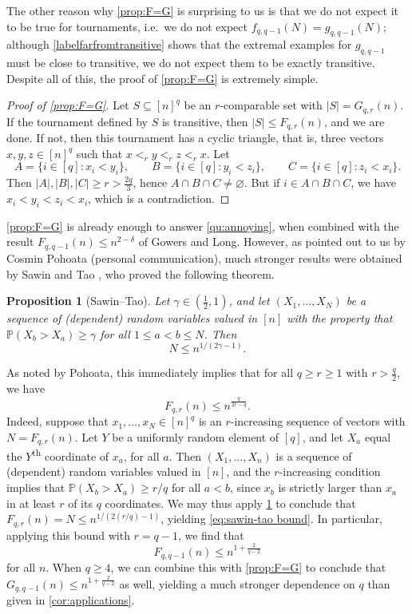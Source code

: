 \documentclass[11pt,reqno]{amsart}
\newtheorem{proposition}[theorem]{Proposition}
\theoremstyle{definition}
\newcommand\ab[1]{\lvert#1\rvert}
\newcommand\1{\mathbf{1}}
\let\leq\leqslant
\let\geq\geqslant
\begin{document}
The other reason why \cref{prop:F=G} is surprising to us is that we do not expect it to be true for tournaments, i.e.\ we do not expect $f_{q,q-1}(N)=g_{q,q-1}(N)$; although \cref{labelfarfromtransitive} shows that the extremal examples for $g_{q,q-1}$ must be close to transitive, we do not expect them to be exactly transitive.
Despite all of this, the proof of \cref{prop:F=G} is extremely simple.
\begin{proof}[Proof of \cref{prop:F=G}]
    Let $S \subseteq [n]^q$ be an $r$-comparable set with $\ab S = G_{q,r}(n)$. If the tournament defined by $S$ is transitive, then $\ab S \leq F_{q,r}(n)$, and we are done. If not, then this tournament has a cyclic triangle, that is, three vectors $x,y,z \in [n]^q$ such that $x <_r y <_r z <_r x$. Let
    \[
        A = \{i \in [q]: x_i < y_i \} ,\qquad B = \{i \in [q]: y_i < z_i \} ,\qquad C = \{i \in [q]: z_i < x_i \} .
    \]
    Then $\ab A, \ab B, \ab C \geq r > \frac{2q}{3}$, hence $A \cap B \cap C \neq \varnothing$. But if $i \in A \cap B \cap C$, we have $x_i < y_i < z_i < x_i$, which is a contradiction.
\end{proof}
\cref{prop:F=G} is already enough to answer \cref{qu:annoying}, when combined with the result $F_{q,q-1}(n) \leq n^{2-\delta}$ of Gowers and Long. However, as pointed out to us by Cosmin Pohoata (personal communication), much stronger results were obtained by Sawin and Tao \cite{206224}, who proved the following theorem.
\begin{proposition}[Sawin--Tao]\label{prop:sawin-tao}
    Let $\gamma \in (\frac 12, 1)$, and let $(X_1,\dots,X_N)$ be a sequence of (dependent) random variables valued in $[n]$ with the property that $\mathbb P(X_b>X_a) \geq \gamma$ for all $1 \leq a<b\leq N$. Then
    \[
    N \leq n^{1/(2\gamma-1)}.
    \]
\end{proposition}
As noted by Pohoata, this immediately implies that 
for all $q \geq r \geq 1$ with $r>\frac q2$, we have
\begin{equation}\label{eq:sawin-tao bound}
    F_{q,r}(n) \leq n^{\frac{q}{2r-q}}.
\end{equation}
Indeed, suppose that $x_1,\dots,x_N \in [n]^q$ is an $r$-increasing sequence of vectors with $N=F_{q,r}(n)$. Let $Y$ be a uniformly random element of $[q]$, and let $X_a$ equal the $Y$\textsuperscript{th} coordinate of $x_a$, for all $a$. Then $(X_1,\dots,X_n)$ is a sequence of (dependent) random variables valued in $[n]$, and the $r$-increasing condition implies that $\mathbb P(X_b> X_a) \geq r/q$ for all $a<b$, since $x_b$ is strictly larger than $x_a$ in at least $r$ of its $q$ coordinates. We may thus apply \cref{prop:sawin-tao} to conclude that $F_{q,r}(n)=N \leq n^{1/(2(r/q)-1)}$, yielding \eqref{eq:sawin-tao bound}.
In particular, applying this bound with $r=q-1$, we find that
\[
    F_{q,q-1}(n) \leq n^{1+ \frac{2}{q-2}}
\]
for all $n$. When $q \geq 4$, we can combine this with \cref{prop:F=G} to conclude that $G_{q,q-1}(n) \leq n^{1+\frac{2}{q-2}}$ as well, yielding a much stronger dependence on $q$ than given in \cref{cor:applications}.
\end{document}
